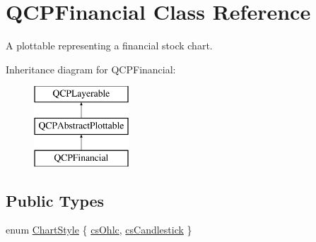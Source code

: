 \hypertarget{classQCPFinancial}{\section{\-Q\-C\-P\-Financial \-Class \-Reference}
\label{classQCPFinancial}
}


\-A plottable representing a financial stock chart.  


\-Inheritance diagram for \-Q\-C\-P\-Financial\-:\begin{figure}[H]
\begin{center}
\leavevmode
\includegraphics[height=3.000000cm]{classQCPFinancial}
\end{center}
\end{figure}
\subsection*{\-Public \-Types}
\begin{DoxyCompactItemize}
\item 
enum \hyperlink{classQCPFinancial_a0f800e21ee98d646dfc6f8f89d10ebfb}{\-Chart\-Style} \{ \hyperlink{classQCPFinancial_a0f800e21ee98d646dfc6f8f89d10ebfba3a516016c9298d3e95dd82aa203c4390}{cs\-Ohlc}, 
\hyperlink{classQCPFinancial_a0f800e21ee98d646dfc6f8f89d10ebfbac803cbd39f26e3f206bcc7028679e62f}{cs\-Candlestick}
 \}
\end{DoxyCompactItemize}
